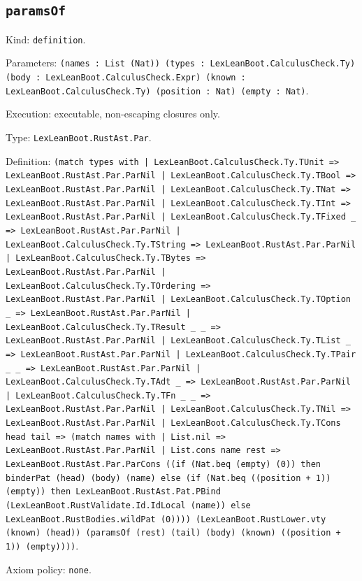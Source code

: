\documentclass[11pt]{article}
\begin{document}
\subsection*{\texttt{paramsOf}}
\noindent Kind: \texttt{definition}.\par
\noindent Parameters: \texttt{(names : List (Nat)) (types : LexLeanBoot.CalculusCheck.Ty) (body : LexLeanBoot.CalculusCheck.Expr) (known : LexLeanBoot.CalculusCheck.Ty) (position : Nat) (empty : Nat)}.\par
\noindent Execution: executable, non-escaping closures only.\par
\noindent Type: \texttt{LexLeanBoot.RustAst.Par}.\par
\noindent Definition: \texttt{(match types with | LexLeanBoot.CalculusCheck.Ty.TUnit => LexLeanBoot.RustAst.Par.ParNil | LexLeanBoot.CalculusCheck.Ty.TBool => LexLeanBoot.RustAst.Par.ParNil | LexLeanBoot.CalculusCheck.Ty.TNat => LexLeanBoot.RustAst.Par.ParNil | LexLeanBoot.CalculusCheck.Ty.TInt => LexLeanBoot.RustAst.Par.ParNil | LexLeanBoot.CalculusCheck.Ty.TFixed \_ => LexLeanBoot.RustAst.Par.ParNil | LexLeanBoot.CalculusCheck.Ty.TString => LexLeanBoot.RustAst.Par.ParNil | LexLeanBoot.CalculusCheck.Ty.TBytes => LexLeanBoot.RustAst.Par.ParNil | LexLeanBoot.CalculusCheck.Ty.TOrdering => LexLeanBoot.RustAst.Par.ParNil | LexLeanBoot.CalculusCheck.Ty.TOption \_ => LexLeanBoot.RustAst.Par.ParNil | LexLeanBoot.CalculusCheck.Ty.TResult \_ \_ => LexLeanBoot.RustAst.Par.ParNil | LexLeanBoot.CalculusCheck.Ty.TList \_ => LexLeanBoot.RustAst.Par.ParNil | LexLeanBoot.CalculusCheck.Ty.TPair \_ \_ => LexLeanBoot.RustAst.Par.ParNil | LexLeanBoot.CalculusCheck.Ty.TAdt \_ => LexLeanBoot.RustAst.Par.ParNil | LexLeanBoot.CalculusCheck.Ty.TFn \_ \_ => LexLeanBoot.RustAst.Par.ParNil | LexLeanBoot.CalculusCheck.Ty.TNil => LexLeanBoot.RustAst.Par.ParNil | LexLeanBoot.CalculusCheck.Ty.TCons head tail => (match names with | List.nil => LexLeanBoot.RustAst.Par.ParNil | List.cons name rest => LexLeanBoot.RustAst.Par.ParCons ((if (Nat.beq (empty) (0)) then binderPat (head) (body) (name) else (if (Nat.beq ((position + 1)) (empty)) then LexLeanBoot.RustAst.Pat.PBind (LexLeanBoot.RustValidate.Id.IdLocal (name)) else LexLeanBoot.RustBodies.wildPat (0)))) (LexLeanBoot.RustLower.vty (known) (head)) (paramsOf (rest) (tail) (body) (known) ((position + 1)) (empty))))}.\par
\noindent Axiom policy: \texttt{none}.\par
\end{document}
